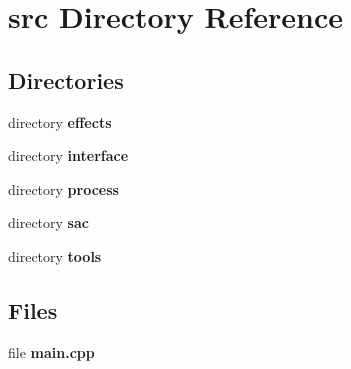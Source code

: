 \section{src Directory Reference}
\label{dir_68267d1309a1af8e8297ef4c3efbcdba}
\subsection*{Directories}
\begin{DoxyCompactItemize}
\item 
directory \textbf{ effects}
\item 
directory \textbf{ interface}
\item 
directory \textbf{ process}
\item 
directory \textbf{ sac}
\item 
directory \textbf{ tools}
\end{DoxyCompactItemize}
\subsection*{Files}
\begin{DoxyCompactItemize}
\item 
file \textbf{ main.\+cpp}
\end{DoxyCompactItemize}
